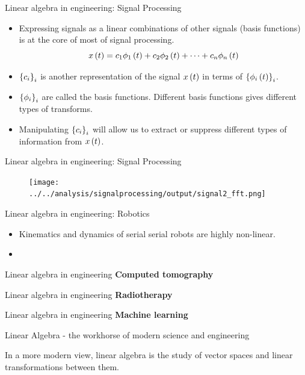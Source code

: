 \documentclass[aspectratio=169]{beamer}
\let\olditem\item
\renewcommand{\item}{\setlength{\itemsep}{\fill}\olditem}
\def\lp{\ensuremath\left(}
\def\rp{\ensuremath\right)}
\def\lc{\ensuremath\left\{}
\def\rc{\ensuremath\right\}}
\newcommand{\ct}[1]{\lp #1\rp}
\begin{document}
\begin{frame}{Linear algebra in engineering: Signal Processing}
  \begin{itemize}
    \item Expressing signals as a linear combinations of other signals (basis functions) is at the core of most of signal processing.
    \[ x\ct{t} = c_1 \phi_1\ct{t} + c_2 \phi_2\ct{t} + \cdots + c_n \phi_n\ct{t} \]

    \item $\lc c_i \rc_{i}$ is another representation of the signal $x\ct{t}$ in terms of $\lc \phi_i\ct{t} \rc_i$.
    
    \item $\lc \phi_i \rc_{i}$ are called the basis functions.  Different basis functions gives different types of transforms.
    
    \item Manipulating $\lc c_i \rc_i$ will allow us to extract or suppress different types of information from $x\ct{t}$.
  \end{itemize}
\end{frame}


\begin{frame}{Linear algebra in engineering: Signal Processing}
  \begin{figure}
    \centering
    \texttt{[image: ../../analysis/signalprocessing/output/signal2\_fft.png]}
  \end{figure}
\end{frame}


\begin{frame}{Linear algebra in engineering: Robotics}
  \begin{itemize}
    \item Kinematics and dynamics of serial serial robots are highly non-linear.
    \item 
  \end{itemize}
  
\end{frame}


\begin{frame}{Linear algebra in engineering}
  \textbf{Computed tomography}
  
\end{frame}


\begin{frame}{Linear algebra in engineering}
  \textbf{Radiotherapy}
  
\end{frame}


\begin{frame}{Linear algebra in engineering}
  \textbf{Machine learning}
  
\end{frame}


\begin{frame}{Linear Algebra - the workhorse of modern science and engineering}

  In a more modern view, linear algebra is the study of vector spaces and linear transformations between them.
\end{frame}
\end{document}
